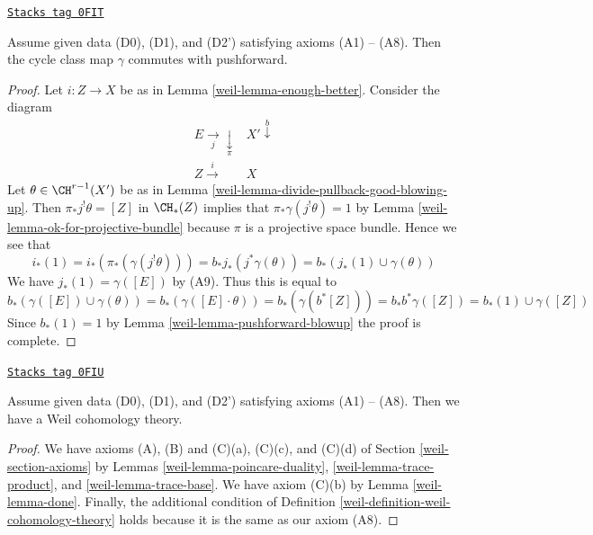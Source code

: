 \begin{lemma}[Done]
\label{weil-lemma-done}
\href{https://stacks.math.columbia.edu/tag/0FIT}{\texttt{Stacks tag 0FIT}}

Assume given data (D0), (D1), and (D2') satisfying axioms (A1) -- (A8).
Then the cycle class map $\gamma$ commutes with pushforward.
\end{lemma}

\begin{proof}

Let $i : Z \to X$ be as in Lemma \ref{weil-lemma-enough-better}. Consider
the diagram
$$
\begin{array}{cc}E \underset{j}{\longrightarrow}\underset{\pi}{\downarrow} & X' \overset{b}{\downarrow} \\ Z \overset{i}{\longrightarrow} & X\end{array}
$$
Let $\theta \in \CH^{r - 1}(X')$ be as in
Lemma \ref{weil-lemma-divide-pullback-good-blowing-up}.
Then $\pi_*j^!\theta = [Z]$ in $\CH_*(Z)$ implies that
$\pi_*\gamma(j^!\theta) = 1$ by Lemma \ref{weil-lemma-ok-for-projective-bundle}
because $\pi$ is a projective space bundle.
Hence we see that
$$
i_*(1) = i_*(\pi_*(\gamma(j^!\theta))) =
b_*j_*(j^*\gamma(\theta)) =
b_*(j_*(1) \cup \gamma(\theta))
$$
We have $j_*(1) = \gamma([E])$ by (A9). Thus this is equal to
$$
b_*(\gamma([E]) \cup \gamma(\theta)) =
b_*(\gamma([E] \cdot \theta)) =
b_*(\gamma(b^*[Z])) =
b_*b^*\gamma([Z]) = b_*(1) \cup \gamma([Z])
$$
Since $b_*(1) = 1$ by Lemma \ref{weil-lemma-pushforward-blowup} the
proof is complete.
\end{proof}

\begin{proposition}
\label{weil-proposition-get-weil}
\href{https://stacks.math.columbia.edu/tag/0FIU}{\texttt{Stacks tag 0FIU}}

Assume given data (D0), (D1), and (D2') satisfying axioms (A1) -- (A8).
Then we have a Weil cohomology theory.
\end{proposition}

\begin{proof}

We have axioms (A), (B) and (C)(a), (C)(c), and (C)(d) of
Section \ref{weil-section-axioms} by
Lemmas \ref{weil-lemma-poincare-duality}, \ref{weil-lemma-trace-product}, and
\ref{weil-lemma-trace-base}.
We have axiom (C)(b) by
Lemma \ref{weil-lemma-done}.
Finally, the additional condition of
Definition \ref{weil-definition-weil-cohomology-theory}
holds because it is the same as our axiom (A8).
\end{proof}

